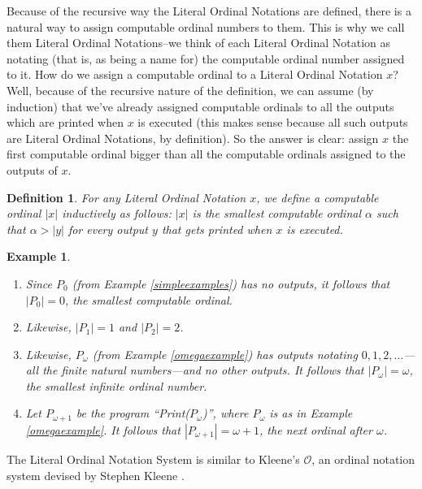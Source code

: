 \documentclass[runningheads]{llncs}
\newtheorem{myexample}[mytheorem]{Example}
\newtheorem{mydefinition}[mytheorem]{Definition}
\begin{document}
Because of the recursive way the Literal Ordinal Notations are defined, there is a
natural way to assign computable ordinal numbers to them. This is why we call them
Literal Ordinal Notations--we think of each Literal Ordinal Notation as notating
(that is, as being a name for) the computable ordinal number assigned to it.
How do we assign a computable ordinal to a Literal Ordinal Notation $x$? Well, because
of the recursive nature of the definition, we can assume (by induction) that we've
already assigned computable ordinals to all the outputs which are printed when $x$
is executed (this makes sense because all such outputs are Literal Ordinal Notations,
by definition). So the answer is clear: assign $x$ the first computable ordinal bigger
than all the computable ordinals assigned to the outputs of $x$.

\begin{mydefinition}
    For any Literal Ordinal Notation $x$, we define a computable ordinal $|x|$
    inductively as follows: $|x|$ is the smallest computable ordinal $\alpha$
    such that $\alpha>|y|$ for every output $y$ that gets printed when $x$ is
    executed.
\end{mydefinition}

\begin{myexample}
    \begin{enumerate}
        \item
        Since $P_0$ (from Example \ref{simpleexamples}) has no outputs,
        it follows that $|P_0|=0$, the smallest computable ordinal.
        \item
        Likewise, $|P_1|=1$ and $|P_2|=2$.
        \item
        Likewise, $P_\omega$ (from Example \ref{omegaexample}) has outputs
        notating $0, 1, 2, \ldots$---all the finite natural numbers---and no
        other outputs. It follows that $|P_\omega|=\omega$, the smallest
        infinite ordinal number.
        \item
        Let $P_{\omega+1}$ be the program ``Print($P_\omega$)'',
        where $P_\omega$ is as in Example \ref{omegaexample}.
        It follows that $|P_{\omega+1}|=\omega+1$, the next ordinal after
        $\omega$.
    \end{enumerate}
\end{myexample}

The Literal Ordinal Notation System is similar to Kleene's $\mathcal O$,
an ordinal notation system devised by Stephen Kleene \cite{kleene1938notation}.
\end{document}
